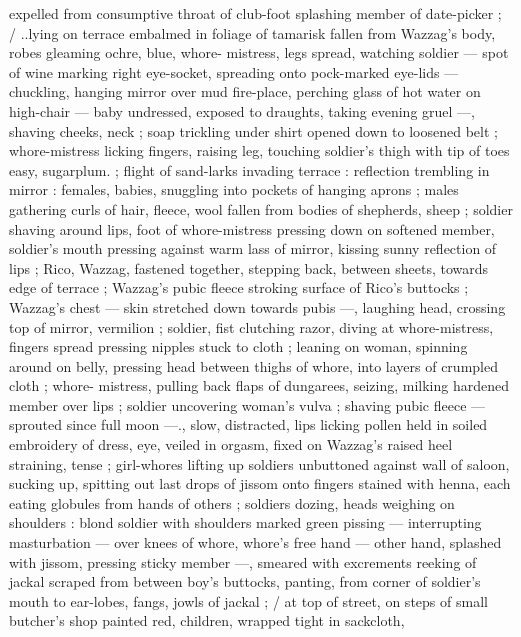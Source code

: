 expelled from consumptive throat of club-foot splashing member of 
date-picker ; {\slash} ..lying on terrace embalmed in foliage of tamarisk 
fallen from Wazzag's body, robes gleaming ochre, blue, whore- 
mistress, legs spread, watching soldier --- spot of wine marking right 
eye-socket, spreading onto pock-marked eye-lids --- chuckling, 
hanging mirror over mud fire-place, perching glass of hot water on 
high-chair --- baby undressed, exposed to draughts, taking evening 
gruel ---, shaving cheeks, neck ; soap trickling under shirt opened 
down to loosened belt ; whore-mistress licking fingers, raising leg, 
touching soldier's thigh with tip of toes{\td} {\gl} easy, sugarplum. {\gr} ; flight 
of sand-larks invading terrace : reflection trembling in mirror : 
females, babies, snuggling into pockets of hanging aprons ; males 
gathering curls of hair, fleece, wool fallen from bodies of shepherds, 
sheep ; soldier shaving around lips, foot of whore-mistress pressing 
down on softened member, soldier's mouth pressing against warm 
lass of mirror, kissing sunny reflection of lips ; Rico, Wazzag, 
fastened together, stepping back, between sheets, towards edge of 
terrace ; Wazzag's pubic fleece stroking surface of Rico's buttocks ; 
Wazzag's chest --- skin stretched down towards pubis ---, laughing 
head, crossing top of mirror, vermilion ; soldier, fist clutching razor, 
diving at whore-mistress, fingers spread pressing nipples stuck to 
cloth ; leaning on woman, spinning around on belly, pressing head 
between thighs of whore, into layers of crumpled cloth ; whore- 
mistress, pulling back flaps of dungarees, seizing, milking hardened 
member over lips ; soldier uncovering woman's vulva ; shaving pubic 
fleece --- sprouted since full moon ---., slow, distracted, lips licking 
pollen held in soiled embroidery of dress, eye, veiled in orgasm, 
fixed on Wazzag's raised heel straining, tense ; girl-whores lifting up 
soldiers unbuttoned against wall of saloon, sucking up, spitting out 
last drops of jissom onto fingers stained with henna, each eating 
globules from hands of others ; soldiers dozing, heads weighing on 
shoulders : blond soldier with shoulders marked green pissing --- 
interrupting masturbation --- over knees of whore, whore's free 
hand --- other hand, splashed with jissom, pressing sticky member 
---, smeared with excrements reeking of jackal scraped from 
between boy's buttocks, panting, from corner of soldier's mouth to 
ear-lobes, fangs, jowls of jackal ; {\slash} at top of street, on steps of small 
butcher's shop painted red, children, wrapped tight in sackcloth, 
